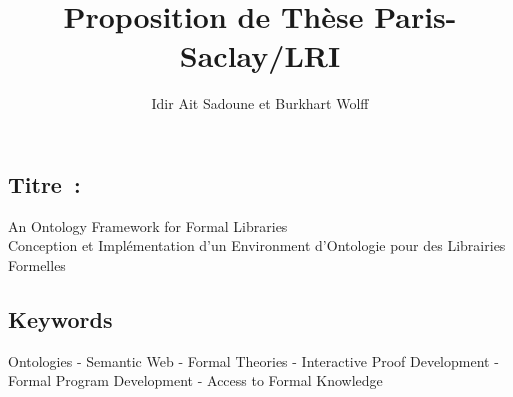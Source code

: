 \documentclass[a4paper,10pt]{article}
\begin{document}
\title{\textbf{Proposition de Thèse Paris-Saclay/LRI}}
\author{Idir Ait Sadoune et Burkhart Wolff}
\date{}

\maketitle

\subsection*{Titre~:}
\begin{center}
\large An Ontology Framework for Formal Libraries \\
          Conception et Implémentation d'un Environment d'Ontologie pour des Librairies Formelles
\end{center}



\subsection{Keywords}
Ontologies - Semantic Web - Formal Theories - Interactive Proof Development - Formal Program Development - Access to Formal Knowledge
\end{document}

